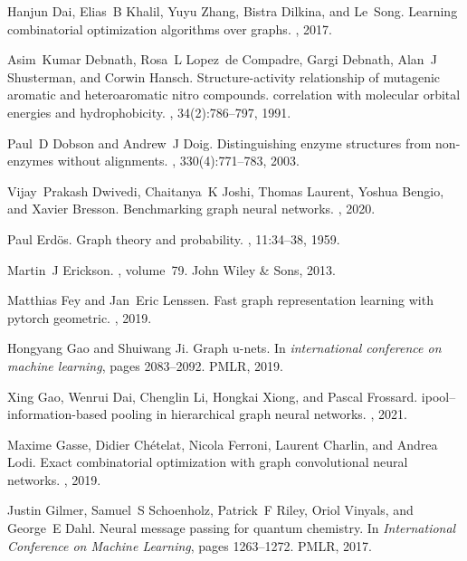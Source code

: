 \documentclass{article}
\begin{document}
\begin{thebibliography}{999}
	Hanjun Dai, Elias~B Khalil, Yuyu Zhang, Bistra Dilkina, and Le~Song.
	\newblock Learning combinatorial optimization algorithms over graphs.
	, 2017.
	
	Asim~Kumar Debnath, Rosa~L Lopez~de Compadre, Gargi Debnath, Alan~J Shusterman,
	and Corwin Hansch.
	\newblock Structure-activity relationship of mutagenic aromatic and
	heteroaromatic nitro compounds. correlation with molecular orbital energies
	and hydrophobicity.
	, 34(2):786--797, 1991.
	
	Paul~D Dobson and Andrew~J Doig.
	\newblock Distinguishing enzyme structures from non-enzymes without alignments.
	, 330(4):771--783, 2003.
	
	Vijay~Prakash Dwivedi, Chaitanya~K Joshi, Thomas Laurent, Yoshua Bengio, and
	Xavier Bresson.
	\newblock Benchmarking graph neural networks.
	, 2020.
	
	Paul Erd{\"o}s.
	\newblock Graph theory and probability.
	, 11:34--38, 1959.
	
	Martin~J Erickson.
	, volume~79.
	\newblock John Wiley \& Sons, 2013.
	
	Matthias Fey and Jan~Eric Lenssen.
	\newblock Fast graph representation learning with pytorch geometric.
	, 2019.
	
	Hongyang Gao and Shuiwang Ji.
	\newblock Graph u-nets.
	\newblock In {\em international conference on machine learning}, pages
	2083--2092. PMLR, 2019.
	
	Xing Gao, Wenrui Dai, Chenglin Li, Hongkai Xiong, and Pascal Frossard.
	\newblock ipool--information-based pooling in hierarchical graph neural
	networks.
	,
	2021.
	
	Maxime Gasse, Didier Ch{\'e}telat, Nicola Ferroni, Laurent Charlin, and Andrea
	Lodi.
	\newblock Exact combinatorial optimization with graph convolutional neural
	networks.
	, 2019.
	
	Justin Gilmer, Samuel~S Schoenholz, Patrick~F Riley, Oriol Vinyals, and
	George~E Dahl.
	\newblock Neural message passing for quantum chemistry.
	\newblock In {\em International Conference on Machine Learning}, pages
	1263--1272. PMLR, 2017.
	

\end{thebibliography}
\end{document}

